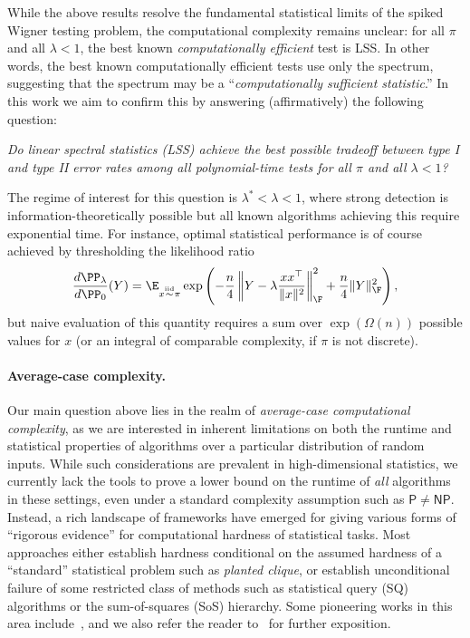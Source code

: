 \documentclass[11pt]{article}
\begin{document}
While the above results resolve the fundamental statistical limits of the spiked Wigner testing problem, the computational complexity remains unclear: for all $\pi$ and all $\lambda < 1$, the best known \emph{computationally efficient} test is LSS. In other words, the best known computationally efficient tests use only the spectrum, suggesting that the spectrum may be a ``\emph{computationally sufficient statistic}.'' In this work we aim to confirm this by answering (affirmatively) the following question:
\begin{center}
\emph{Do linear spectral statistics (LSS) achieve the best possible tradeoff between type I and type II error rates among all polynomial-time tests for all $\pi$ and all $\lambda < 1$?}
\end{center}
The regime of interest for this question is $\lambda^* < \lambda < 1$, where strong detection is information-theoretically possible but all known algorithms achieving this require exponential time. For instance, optimal statistical performance is of course achieved by thresholding the likelihood ratio
\begin{equation}\label{eq:wig-lr}
\frac{d\PP_\lambda}{d\PP_0}(Y) = \E_{x \stackrel{\mathrm{iid}}{\sim} \pi} \exp\left(-\frac{n}{4}\left\|Y - \lambda\frac{xx^\top}{\|x\|^2}\right\|_\F^2 + \frac{n}{4}\|Y\|_\F^2\right),
\end{equation}
but naive evaluation of this quantity requires a sum over $\exp(\Omega(n))$ possible values for $x$ (or an integral of comparable complexity, if $\pi$ is not discrete).

\paragraph{Average-case complexity.} Our main question above lies in the realm of \emph{average-case computational complexity}, as we are interested in inherent limitations on both the runtime and statistical properties of algorithms over a particular distribution of random inputs. While such considerations are prevalent in high-dimensional statistics, we currently lack the tools to prove a lower bound on the runtime of \emph{all} algorithms in these settings, even under a standard complexity assumption such as $\mathsf{P} \ne \mathsf{NP}$. Instead, a rich landscape of frameworks have emerged for giving various forms of ``rigorous evidence'' for computational hardness of statistical tasks. Most approaches either establish hardness conditional on the assumed hardness of a ``standard'' statistical problem such as \emph{planted clique}, or establish unconditional failure of some restricted class of methods such as statistical query (SQ) algorithms or the sum-of-squares (SoS) hierarchy. Some pioneering works in this area include~\cite{jerrum,decelle,sq-clique,BR-reduction,GS-ogp,sos-clique}, and we also refer the reader to~\cite{sos-survey,ld-notes,secret-leakage,phys-survey} for further exposition.
\end{document}
